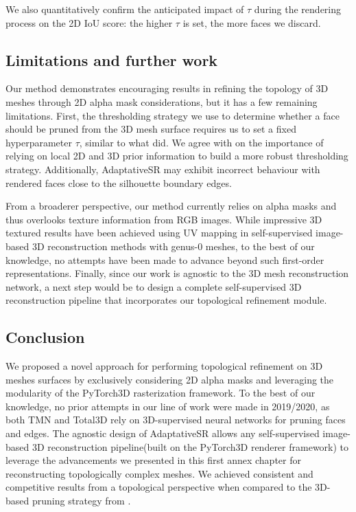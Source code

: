 We also quantitatively confirm the anticipated impact of $\tau$ during the rendering process on the 2D \ac{IoU} score: the higher $\tau$ is set, the more faces we discard. 

\subsection{Limitations and further work}

Our method demonstrates encouraging results in refining the topology of 3D meshes through 2D alpha mask considerations, but it has a few remaining limitations. First, the thresholding strategy we use to determine whether a face should be pruned from the 3D mesh surface requires us to set a fixed hyperparameter $\tau$, similar to what \citep{pan2019deep} did. We agree with \citep{nie2020total3dunderstanding} on the importance of relying on local 2D and 3D prior information to build a more robust thresholding strategy. Additionally, AdaptativeSR may exhibit incorrect behaviour with rendered faces close to the silhouette boundary edges. 

From a broaderer perspective, our method currently relies on alpha masks and thus overlooks texture information from RGB images. While impressive 3D textured results have been achieved using UV mapping in self-supervised image-based 3D reconstruction methods with genus-0 meshes\citep{li2020self,pavllo2020convolutional}, to the best of our knowledge, no attempts have been made to advance beyond such first-order representations. Finally, since our work is agnostic to the 3D mesh reconstruction network, a next step would be to design a complete self-supervised 3D reconstruction pipeline that incorporates our topological refinement module. 

\subsection{Conclusion}
\label{sec:conclusion}
We proposed a novel approach for performing topological refinement on 3D meshes surfaces by exclusively considering 2D alpha masks and leveraging the modularity of the PyTorch3D rasterization framework. To the best of our knowledge, no prior attempts in our line of work were made in 2019/2020, as both TMN \citep{pan2019deep} and Total3D \citep{nie2020total3dunderstanding} rely on 3D-supervised neural networks for pruning faces and edges. The agnostic design of AdaptativeSR allows any self-supervised image-based 3D reconstruction pipeline(built on the PyTorch3D renderer framework) to leverage the advancements we presented in this first annex chapter for reconstructing topologically complex meshes. We achieved consistent and competitive results from a topological perspective when compared to the 3D-based pruning strategy from \citep{pan2019deep}. 

